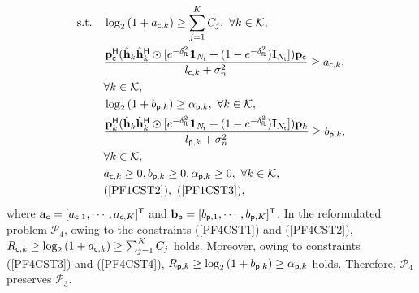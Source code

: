 \documentclass[draftclsnofoot, onecolumn, comsoc, 12pt]{IEEEtran}
\begin{document}
\begin{subequations}\label{condition}
\begin{align}
\mathrm{s.t.}\,\,\,\,\,\,
\label{PF4CST1}
&\log_{2}{(1+a_{{\sf{c}},k})} \geq \sum_{j=1}^{K}{C_j}, \,\, \forall k \in \mathcal{K}, \\
\label{PF4CST2}
&\frac{\mathbf{p}_{\sf{c}}^{\sf{H}}(\hat{\mathbf{h}}_{k} \hat{\mathbf{h}}_{k}^{\sf{H}} \odot
    [e^{-\delta_{\sf{fb}}^{2}}\mathbf{1}_{N_{{\sf{t}}}} + (1-e^{-\delta_{\sf{fb}}^{2}})\mathbf{I}_{N_{{\sf{t}}}}])\mathbf{p}_{\sf{c}}}
    {l_{{\sf{c}},k} + \sigma_{n}^{2}} \geq a_{{\sf{c}},k},
\nonumber \\
& \forall k \in \mathcal{K},\\
\label{PF4CST3}
&\log_{2}{(1+b_{{\sf{p}},k})} \geq \alpha_{{\sf{p}},k},   \,\, \forall k \in \mathcal{K},\\
\label{PF4CST4}
&\frac{\mathbf{p}_{k}^{\sf{H}}(\hat{\mathbf{h}}_{k} \hat{\mathbf{h}}_{k}^{\sf{H}} \odot
    [e^{-\delta_{\sf{fb}}^{2}}\mathbf{1}_{N_{{\sf{t}}}} + (1-e^{-\delta_{\sf{fb}}^{2}})\mathbf{I}_{N_{{\sf{t}}}}])\mathbf{p}_{k}}
    {l_{{\sf{p}},k} + \sigma_{n}^{2}} \geq b_{{\sf{p}},k},
\nonumber \\
& \forall k \in \mathcal{K},\\
\label{PF4CST5}
&a_{{\sf{c}},k} \geq 0, b_{{\sf{p}},k} \geq 0, \alpha_{{\sf{p}},k} \geq 0, \,\, \forall k \in \mathcal{K},\\
& \textrm{(\ref{PF1CST2})}, \,\,  \textrm{(\ref{PF1CST3})}, \nonumber 
\end{align}
\end{subequations}
where $\mathbf{a}_{\sf{c}}=[a_{{\sf{c}},1},\cdots,a_{{\sf{c}},K}]^{\sf{T}}$ and $\mathbf{b}_{\sf{p}}=[b_{{\sf{p}},1},\cdots,b_{{\sf{p}},K}]^{\sf{T}}$. In the reformulated problem $\mathscr{P}_{4}$, owing to the constraints (\ref{PF4CST1}) and (\ref{PF4CST2}), $R_{{\sf{c}}, k} \geq \log_{2}{(1+a_{{\sf{c}}, k})} \geq \sum_{j=1}^{K}{C_{j}}$ holds. Moreover, owing to constraints (\ref{PF4CST3}) and (\ref{PF4CST4}), $R_{{\sf{p}}, k} \geq \log_{2}{(1+b_{{\sf{p}}, k})} \geq \alpha_{{\sf{p}},k}$ holds. Therefore, $\mathscr{P}_4$ preserves $\mathscr{P}_3$. 
\end{document}
